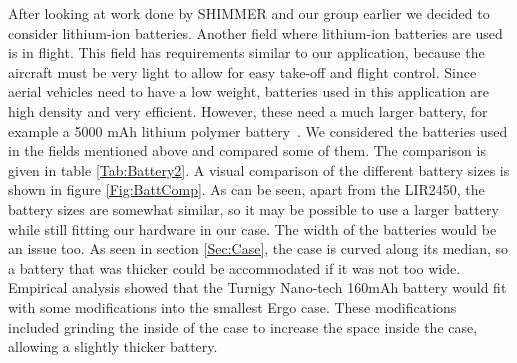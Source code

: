 After looking at work done by SHIMMER and our group earlier \cite{Web:ShimmerHome,drennan2010assessment} we decided to consider lithium-ion batteries. Another field where lithium-ion batteries are used is in flight. This field has requirements similar to our application, because the aircraft must be very light to allow for easy take-off and flight control. Since aerial vehicles need to have a low weight, batteries used in this application are high density and very efficient. However, these need a much larger battery, for example a 5000 mAh lithium polymer battery~\cite{neitzel2011mobile}. We considered the batteries used in the fields mentioned above and compared some of them. The comparison is given in table \ref{Tab:Battery2}.
A visual comparison of the different battery sizes is shown in figure \ref{Fig:BattComp}. As can be seen, apart from the LIR2450, the battery sizes are somewhat similar,
so it may be possible to use a larger battery while still fitting our hardware in our case.
The width of the batteries would be an issue too.
As seen in section \ref{Sec:Case},
the case is curved along its median,
so a battery that was thicker could be accommodated if it was not too wide.
Empirical analysis showed that the Turnigy Nano-tech 160mAh battery
would fit with some modifications into the smallest Ergo case.
These modifications included grinding the inside of the case to increase the space inside the case,
allowing a slightly thicker battery.


